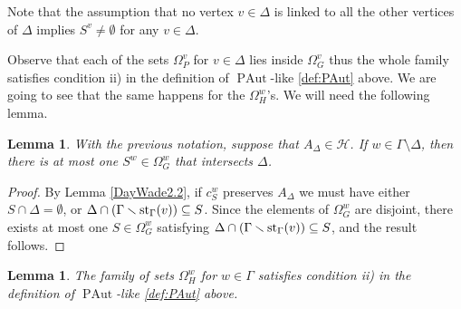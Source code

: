 \documentclass[10pt]{amsart}
\newtheorem{lemma}[theorem]{Lemma}
\theoremstyle{definition}
\newcommand{\st}{{\rm st}}
\newcommand{\PAut}{\operatorname{PAut}}
\theoremstyle{definition}
\numberwithin{equation}{section}
\begin{document}
Note that the assumption that no vertex $v\in\Delta$ is linked to all the other vertices of $\Delta$ implies $S^v\neq\emptyset$ for any $v\in\Delta$.  


Observe that each of the sets $\Omega^v_P$ for $v\in\Delta$ lies inside $\Omega^v_G$ thus the whole family satisfies condition ii) in the definition of $\PAut$-like \ref{def:PAut} above. We are going to see that the same happens for the $\Omega_H^w$'s. We will need the following lemma.





\begin{lemma}\label{lem:condH} With the previous notation, suppose that $A_\Delta\in\mathcal{H}$. If $w\in\Gamma\setminus\Delta$, then there is at most one $S^w\in\Omega_G^w$ that intersects $\Delta$.
\end{lemma}
\begin{proof} By Lemma \ref{DayWade2.2}, if $c^w_S$ preserves $A_\Delta$ we must have either $S\cap\Delta=\emptyset$, or $\Delta\cap(\Gamma\smallsetminus\st_\Gamma(v))\subseteq S$. Since the elements of $\Omega_G^w$ are disjoint, there exists at most one $S \in \Omega_G^w$ satisfying $\Delta\cap(\Gamma\smallsetminus\st_\Gamma(v))\subseteq S$, and the result follows.
\end{proof}



\begin{lemma} The family of sets $\Omega^w_H$ for $w\in\Gamma$ satisfies condition ii) in the definition of $\PAut$-like \ref{def:PAut} above.
\end{lemma}
\end{document}
